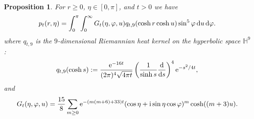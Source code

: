 \documentclass[pdftex]{sigma}
\numberwithin{equation}{section}
\newtheorem{Proposition}[Theorem]{Proposition}
 { \theoremstyle{definition}
\newtheorem{Example}[Theorem]{Example}
\newtheorem{Remark}[Theorem]{Remark} }
\begin{document}
\begin{Proposition}\label{prop:3}
For $r\geq 0$, $\eta\in [0,\pi]$, and $t>0$ we have
\begin{gather*}
p_t(r,\eta)= \int_0^\pi \int_{0}^{\infty} G_t(\eta, \varphi, u) q_{t,9}(\cosh r \cosh u) \sin^5 \varphi \, {\rm d}u \, {\rm d} \varphi .
\end{gather*}
where $q_{t,9}$ is the $9$-dimensional Riemannian heat kernel on the hyperbolic space $\mathbb{H}^{9}$:
\begin{gather*}%
q_{t,9}(\cosh s):=\frac{{\rm e}^{-16t}}{(2\pi)^4 \sqrt{4\pi t}}\left(\frac{1}{\sinh s}\frac{{\rm d}}{{\rm d}s}\right)^{4}{\rm e}^{-s^2/4t},
\end{gather*}
and
\begin{gather}\label{function G}
 G_t(\eta, \varphi, u)
= \frac{15}{8} \sum_{m\geq 0}{\rm e}^{-(m(m+6)+33)t} (\cos \eta + {\rm i}\sin \eta \cos \varphi)^m \cosh((m+3)u).
\end{gather}
\end{Proposition}
\end{document}
